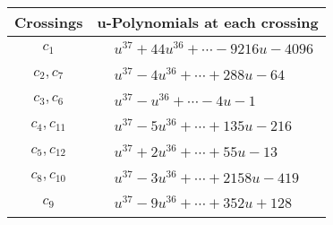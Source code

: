 \documentclass[1p]{elsarticle_modified}
\theoremstyle{definition}
\begin{document}
\begin{tabular}{m{50pt}|m{274pt}}
Crossings & \hspace{64pt}u-Polynomials at each crossing \\
\hline $$\begin{aligned}c_{1}\end{aligned}$$&$\begin{aligned}
&u^{37}+44 u^{36}+\cdots-9216 u-4096
\end{aligned}$\\
\hline $$\begin{aligned}c_{2},c_{7}\end{aligned}$$&$\begin{aligned}
&u^{37}-4 u^{36}+\cdots+288 u-64
\end{aligned}$\\
\hline $$\begin{aligned}c_{3},c_{6}\end{aligned}$$&$\begin{aligned}
&u^{37}- u^{36}+\cdots-4 u-1
\end{aligned}$\\
\hline $$\begin{aligned}c_{4},c_{11}\end{aligned}$$&$\begin{aligned}
&u^{37}-5 u^{36}+\cdots+135 u-216
\end{aligned}$\\
\hline $$\begin{aligned}c_{5},c_{12}\end{aligned}$$&$\begin{aligned}
&u^{37}+2 u^{36}+\cdots+55 u-13
\end{aligned}$\\
\hline $$\begin{aligned}c_{8},c_{10}\end{aligned}$$&$\begin{aligned}
&u^{37}-3 u^{36}+\cdots+2158 u-419
\end{aligned}$\\
\hline $$\begin{aligned}c_{9}\end{aligned}$$&$\begin{aligned}
&u^{37}-9 u^{36}+\cdots+352 u+128
\end{aligned}$\\
\hline
\end{tabular}\\~\\
\newpage\renewcommand{\arraystretch}{1}
\end{document}
